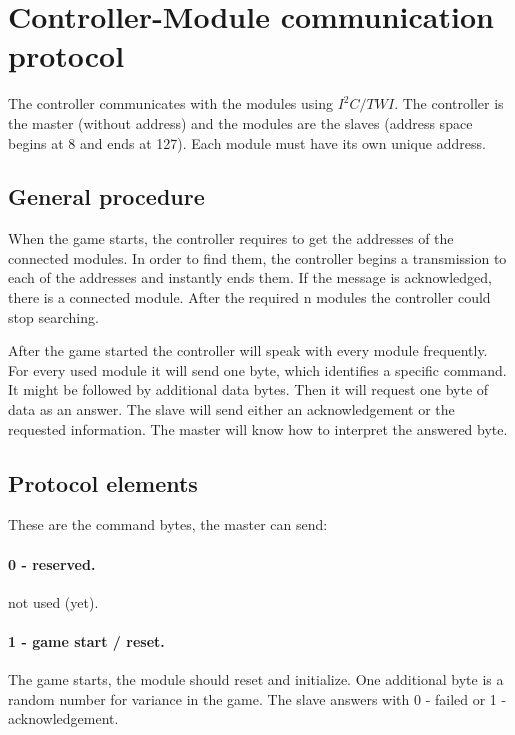 \documentclass[a4paper, 12pt]{article}
\begin{document}
\section*{Controller-Module communication protocol}

The controller communicates with the modules using $I^2C/TWI$. The controller is the master (without address) and the modules are the slaves (address space begins at 8 and ends at 127). Each module must have its own unique address.

\subsection*{General procedure}

When the game starts, the controller requires to get the addresses of the connected modules. In order to find them, the controller begins a transmission to each of the addresses and instantly ends them. If the message is acknowledged, there is a connected module. After the required n modules the controller could stop searching.

After the game started the controller will speak with every module frequently. For every used module it will send one byte, which identifies a specific command. It might be followed by additional data bytes. Then it will request one byte of data as an answer. The slave will send either an acknowledgement or the requested information. The master will know how to interpret the answered byte.

\subsection*{Protocol elements}

These are the command bytes, the master can send:

\paragraph*{0 - reserved.}
not used (yet).

\paragraph*{1 - game start / reset.}
The game starts, the module should reset and initialize. One additional byte is a random number for variance in the game. The slave answers with 0 - failed or 1 - acknowledgement.
\end{document}
